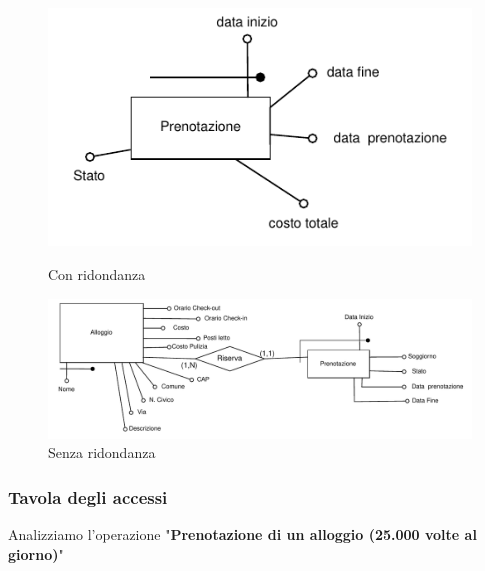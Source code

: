 \begin{figure}[H]
      \centering
      \begin{minipage}[b]{0.3\textwidth}
            \includegraphics[width=\textwidth]{resources/pdf/page5.pdf}
            \caption{Con ridondanza}
      \end{minipage}
      \centering
      \begin{minipage}[b]{0.6\textwidth}
            \includegraphics[width=\textwidth]{resources/pdf/page6.pdf}
            \caption{Senza ridondanza}
      \end{minipage}
\end{figure}

\clearpage
\subsubsection{Tavola degli accessi}
Analizziamo l'operazione "\textbf{Prenotazione di un alloggio (25.000 volte al giorno)}"

